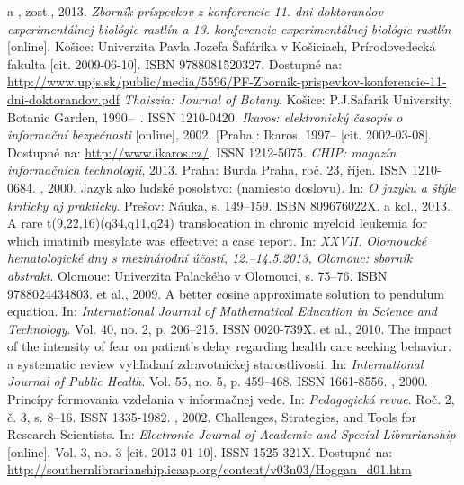 \documentclass[thesismargins, thesislinespacing, twoside, openright, upjsfrontpage]{rnthesis}
\begin{document}
\begin{thebibliography}{9}
	 a , zost., 2013. \emph{Zborník príspevkov z konferencie 11. dni doktorandov experimentálnej biológie rastlín a 13. konferencie experimentálnej biológie rastlín} [online]. Košice: Univerzita Pavla Jozefa Šafárika v Košiciach, Prírodovedecká fakulta [cit. 2009-06-10]. ISBN 9788081520327. Dostupné na: \url{
http://www.upjs.sk/public/media/5596/PF-Zbornik-prispevkov-konferencie-11-dni-doktorandov.pdf}
%
	\emph{Thaiszia: Journal of Botany}. Košice: P.J.Safarik University, Botanic Garden, \mbox{1990--\ .} ISSN 1210-0420.
	\emph{Ikaros: elektronický časopis o informační bezpečnosti} [online], 2002. [Praha]: Ikaros. 1997--{} [cit. 2002-03-08]. Dostupné na: \url{http://www.ikaros.cz/}. ISSN 1212-5075.
	\emph{CHIP: magazín informačních technologií}, 2013. Praha: Burda Praha, roč. 23, říjen. ISSN 1210-0684.
	, 2000. Jazyk ako ľudské posolstvo: (namiesto doslovu). In: \emph{O jazyku a štýle kriticky aj prakticky}. Prešov: Náuka, s. 149--159. ISBN 809676022X.
	 a kol., 2013. A rare t(9,22,16)(q34,q11,q24) translocation in chronic myeloid leukemia for which imatinib mesylate was effective: a case report. In: \emph{XXVII. Olomoucké hematologické dny s mezinárodní účastí, 12.--14.5.2013, Olomouc: sborník abstrakt}. Olomouc: Univerzita Palackého v Olomouci, s. 75--76. ISBN 9788024434803.
	 et al., 2009. A better cosine approximate solution to pendulum equation. In: \emph{International Journal of Mathematical Education in Science and Technology}. Vol. 40, no. 2, p. 206--215. ISSN 0020-739X.
	 et al., 2010. The impact of the intensity of fear on patient's delay regarding health care seeking behavior: a systematic review vyhľadaní zdravotníckej starostlivosti. In: \emph{International Journal of Public Health}. Vol. 55, no. 5, p. 459--468. ISSN 1661-8556.
	, 2000. Princípy formovania vzdelania v informačnej vede. In: \emph{Pedagogická revue}. Roč. 2, č. 3, s. 8--16. ISSN 1335-1982.
	, 2002. Challenges, Strategies, and Tools for Research Scientists. In: \emph{Electronic Journal of Academic and Special Librarianship} [online]. Vol. 3, no. 3 [cit. 2013-01-10]. ISSN 1525-321X. Dostupné na: \url{http://southernlibrarianship.icaap.org/content/v03n03/Hoggan_d01.htm}

\end{thebibliography}
\end{document}
